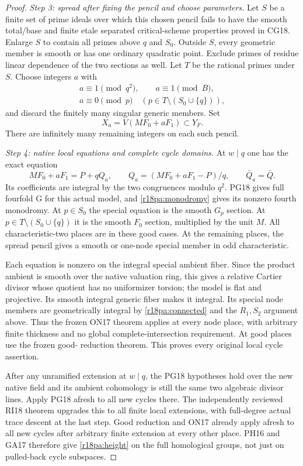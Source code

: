 \begin{proof}
\emph{Step 3: spread after fixing the pencil and choose parameters.}
Let $S$ be a finite set of prime ideals
over which this chosen pencil fails to
have the smooth total/base and finite
etale separated critical-scheme properties
proved in CG18.  Enlarge $S$ to contain
all primes above $q$ and $S_0$.  Outside
$S$, every geometric member is smooth
or has one ordinary quadratic point.
Exclude primes of residue linear
dependence of the two sections as well.
Let $T$ be the rational primes under $S$.
Choose integers $a$ with
\[
 \begin{gathered}
 a\equiv1\pmod{q^2},\qquad a\equiv1\pmod B,\\
 a\equiv0\pmod p\quad(p\in T\setminus(S_0\cup\{q\})),
 \end{gathered}
 \tag{PA18.9}\label{r18pa:parameter-CRT}
\]
and discard the finitely many singular
generic members.  Set
\[
                           X_a=V(MF_0+aF_1)\subset Y_F.
 \tag{PA18.10}\label{r18pa:equation}
\]
There are infinitely many remaining integers
on each such pencil.

\emph{Step 4: native local equations and complete cycle domains.}
At $w\mid q$ one has the exact equation
\[
                 MF_0+aF_1=P+qQ_a,\qquad
                  Q_a=(MF_0+aF_1-P)/q,\qquad\bar Q_a=\bar Q.
 \tag{PA18.11}\label{r18pa:Qa}
\]
Its coefficients are integral by the two
congruences modulo $q^2$.  PG18 gives
full fourfold G for this actual model,
and \eqref{r18pa:monodromy} gives its
nonzero fourth monodromy.
At $p\in S_0$ the special equation is
the smooth $G_p$ section.  At
$p\in T\setminus(S_0\cup\{q\})$ it
is the smooth $F_0$ section, multiplied
by the unit $M$.  All characteristic-two
places are in these good cases.
At the remaining places, the spread
pencil gives a smooth or one-node
special member in odd characteristic.

Each equation is nonzero on the integral
special ambient fiber.  Since the product
ambient is smooth over the native valuation
ring, this gives a relative Cartier divisor
whose quotient has no uniformizer torsion;
the model is flat and projective.  Its
smooth integral generic fiber makes it
integral.  Its special node members are
geometrically integral by
\eqref{r18pa:connected} and the $R_1,S_2$
argument above.  Thus the frozen ON17
theorem applies at every node place,
with arbitrary finite thickness and no
global complete-intersection requirement.
At good places use the frozen good-
reduction theorem.  This proves every
original local cycle assertion.

After any unramified extension at $w\mid q$,
the PG18 hypotheses hold over the new
native field and its ambient cohomology
is still the same two algebraic divisor
lines.  Apply PG18 afresh to all new
cycles there.  The independently reviewed
RI18 theorem upgrades this to all finite
local extensions, with full-degree
actual trace descent at the last step.
Good reduction and ON17 already apply
afresh to all new cycles after arbitrary
finite extension at every other place.
PH16 and GA17 therefore give
\eqref{r18pa:height} on the full homological
groups, not just on pulled-back cycle
subspaces.


\end{proof}
